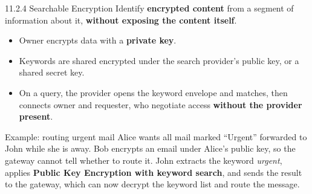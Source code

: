 \documentclass[11pt,aspectratio=169]{beamer}
\newcommand{\kw}[1]{\textbf{\color{accent}#1}}
\begin{document}
\begin{frame}{11.2.4 Searchable Encryption}
  \small
  Identify \kw{encrypted content} from a segment of information about it,
  \kw{without exposing the content itself}.
  \vspace{0.6em}

  \begin{itemize}\small\setlength{\itemsep}{0.35em}
    \item Owner encrypts data with a \kw{private key}.
    \item Keywords are shared encrypted under the search provider's public key,
          or a shared secret key.
    \item On a query, the provider opens the keyword envelope and matches, then
          connects owner and requester, who negotiate access
          \kw{without the provider present}.
  \end{itemize}
  \vspace{0.8em}

  \begin{exampleblock}{Example: routing urgent mail}
    \small
    Alice wants all mail marked ``Urgent'' forwarded to John while she is away.
    Bob encrypts an email under Alice's public key, so the gateway cannot tell
    whether to route it. John extracts the keyword \emph{urgent}, applies
    \kw{Public Key Encryption with keyword search}, and sends the result to the
    gateway, which can now decrypt the keyword list and route the message.
  \end{exampleblock}
\end{frame}
\end{document}
